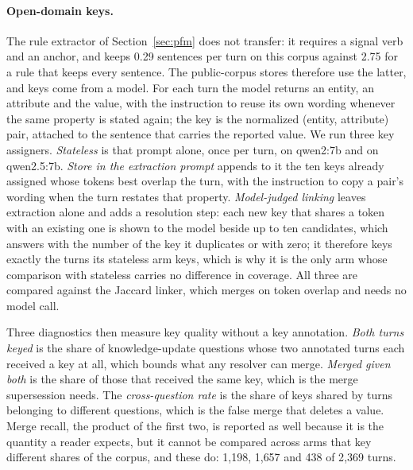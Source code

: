 \documentclass{article} %
\begin{document}
\paragraph{Open-domain keys.} The rule extractor of Section~\ref{sec:pfm} does not transfer: it requires a signal verb and an anchor, and keeps 0.29 sentences per turn on this corpus against 2.75 for a rule that keeps every sentence. The public-corpus stores therefore use the latter, and keys come from a model. For each turn the model returns an entity, an attribute and the value, with the instruction to reuse its own wording whenever the same property is stated again; the key is the normalized (entity, attribute) pair, attached to the sentence that carries the reported value. We run three key assigners. \emph{Stateless} is that prompt alone, once per turn, on qwen2:7b and on qwen2.5:7b. \emph{Store in the extraction prompt} appends to it the ten keys already assigned whose tokens best overlap the turn, with the instruction to copy a pair's wording when the turn restates that property. \emph{Model-judged linking} leaves extraction alone and adds a resolution step: each new key that shares a token with an existing one is shown to the model beside up to ten candidates, which answers with the number of the key it duplicates or with zero; it therefore keys exactly the turns its stateless arm keys, which is why it is the only arm whose comparison with stateless carries no difference in coverage. All three are compared against the Jaccard linker, which merges on token overlap and needs no model call.

Three diagnostics then measure key quality without a key annotation. \emph{Both turns keyed} is the share of knowledge-update questions whose two annotated turns each received a key at all, which bounds what any resolver can merge. \emph{Merged given both} is the share of those that received the same key, which is the merge supersession needs. The \emph{cross-question rate} is the share of keys shared by turns belonging to different questions, which is the false merge that deletes a value. Merge recall, the product of the first two, is reported as well because it is the quantity a reader expects, but it cannot be compared across arms that key different shares of the corpus, and these do: 1{,}198, 1{,}657 and 438 of 2{,}369 turns.
\end{document}
